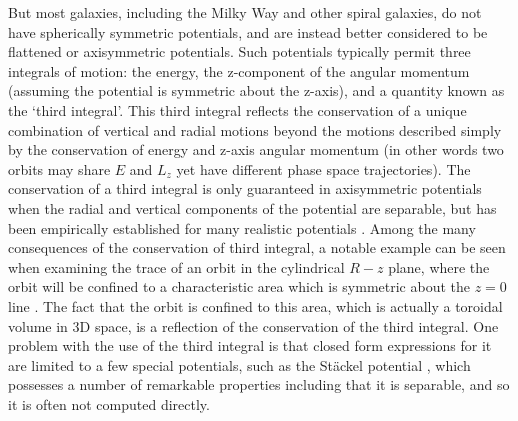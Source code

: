 But most galaxies, including the Milky Way and other spiral galaxies, do not have spherically symmetric potentials, and are instead better considered to be flattened or axisymmetric potentials. Such potentials typically permit three integrals of motion: the energy, the z-component of the angular momentum (assuming the potential is symmetric about the z-axis), and a quantity known as the `third integral'. This third integral reflects the conservation of a unique combination of vertical and radial motions beyond the motions described simply by the conservation of energy and z-axis angular momentum (in other words two orbits may share $E$ and $L_{z}$ yet have different phase space trajectories). The conservation of a third integral is only guaranteed in axisymmetric potentials when the radial and vertical components of the potential are separable, but has been empirically established for many realistic potentials \parencite{ollongren62}. Among the many consequences of the conservation of third integral, a notable example can be seen when examining the trace of an orbit in the cylindrical $R-z$ plane, where the orbit will be confined to a characteristic area which is symmetric about the $z=0$ line \parencite[see figure 3.4 in][]{binney08}. The fact that the orbit is confined to this area, which is actually a toroidal volume in 3D space, is a reflection of the conservation of the third integral. One problem with the use of the third integral is that closed form expressions for it are limited to a few special potentials, such as the St\"{a}ckel potential \parencite{dezeeuw85,dejonghe88}, which possesses a number of remarkable properties including that it is separable, and so it is often not computed directly.

